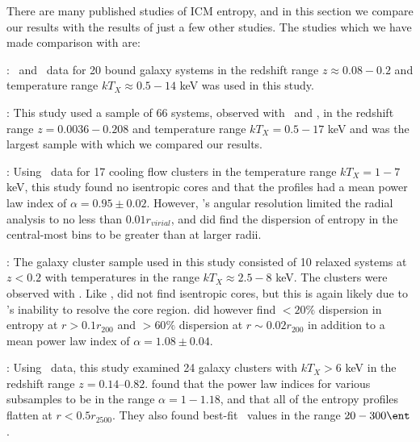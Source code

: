 \documentclass{emulateapj}
\begin{document}
There are many published studies of ICM entropy, and in this section
we compare our results with the results of just a few other
studies. The studies which we have made comparison with are:
\begin{description}
\item \citet{davies00}: \rosat\ and \asca\ data for 20 bound galaxy
  systems in the redshift range $z \approx 0.08-0.2$ and temperature
  range $kT_X \approx 0.5-14$ keV was used in this study.
\item \citet{ponman03}: This study used a sample of 66 systems,
  observed with \rosat\ and \asca, in the redshift range $z=
  0.0036-0.208$ and temperature range $kT_X = 0.5-17$ keV and was the
  largest sample with which we compared our results.
\item \citet{piffaretti05}: Using \xmm\ data for 17 cooling flow
  clusters in the temperature range $kT_X = 1-7$ keV, this study found
  no isentropic cores and that the profiles had a mean power law index
  of $\alpha = 0.95 \pm 0.02$. However, \xmm's angular resolution
  limited the radial analysis to no less than $0.01 r_{virial}$, and
  \citet{piffaretti05} did find the dispersion of entropy in the
  central-most bins to be greater than at larger radii.
\item \citet{pratt06}: The galaxy cluster sample used in this study
  consisted of 10 relaxed systems at $z < 0.2$ with temperatures in
  the range $kT_X \approx 2.5-8$ keV. The clusters were observed with
  \xmm. Like \citet{piffaretti05}, \citet{pratt06} did not find
  isentropic cores, but this is again likely due to \xmm's inability
  to resolve the core region. \citet{pratt06} did however find $<
  20\%$ dispersion in entropy at $r > 0.1r_{200}$ and $> 60\%$
  dispersion at $r \sim 0.02r_{200}$ in addition to a mean power law
  index of $\alpha = 1.08 \pm 0.04$.
\item \citet{morandi07}: Using \chandra\ data, this study examined 24
  galaxy clusters with $kT_X > 6$ keV in the redshift range
  $z=0.14–0.82$. \citet{morandi07} found that the power law indices
  for various subsamples to be in the range $\alpha=1-1.18$, and that
  all of the entropy profiles flatten at $r < 0.5r_{2500}$. They also
  found best-fit \kna\ values in the range $20-300 \ent$.
\end{description}
\end{document}
